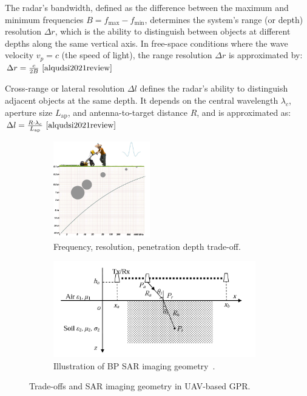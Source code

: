 The radar’s bandwidth, defined as the difference between the maximum and minimum frequencies $B = f_{\text{max}} - f_{\text{min}}$, determines the system’s range (or depth) resolution $\Delta r$, which is the ability to distinguish between objects at different depths along the same vertical axis. In free-space conditions where the wave velocity $v_p = c$ (the speed of light), the range resolution $\Delta r$ is approximated by: \(\Delta r = \frac{c}{2B}~\cite{alqudsi2021review}\)

Cross-range or lateral resolution $\Delta l$ defines the radar’s ability to distinguish adjacent objects at the same depth. It depends on the central wavelength $\lambda_c$, aperture size $L_{\text{ap}}$, and antenna-to-target distance $R$, and is approximated as: \(\Delta l = \frac{R \cdot \lambda_c}{L_{\text{ap}}}~\cite{alqudsi2021review}\)

\begin{figure}[h!]
    \centering
    \begin{subfigure}[t]{0.48\linewidth}
        \centering
        \includegraphics[height=4.2cm]{figs/Huirui/freq_tradeoff.png}
        \caption{Frequency, resolution, penetration depth trade-off\protect\footnotemark.}
        \label{fig:freq_tradeoff}
    \end{subfigure}
    \hfill
    \begin{subfigure}[t]{0.48\linewidth}
        \centering
        \includegraphics[height=4.2cm]{figs/Huirui/bp_geometry.png}
        \caption{Illustration of BP SAR imaging geometry~\cite{lei2014multi}.}
        \label{fig:bp_geometry}
    \end{subfigure}
    \caption{Trade-offs and SAR imaging geometry in UAV-based GPR.}
\end{figure}

